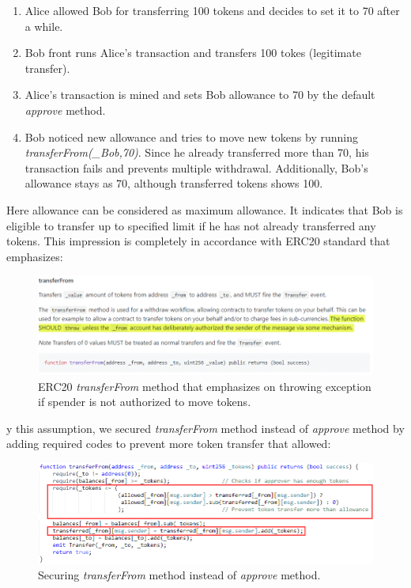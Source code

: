 \begin{enumerate}
	\item Alice allowed Bob for transferring 100 tokens and decides to set it to 70 after a while.
	\item Bob front runs Alice’s transaction and transfers 100 tokes (legitimate transfer).
	\item Alice’s transaction is mined and sets Bob allowance to 70 by the default \textit{approve} method.
	\item Bob noticed new allowance and tries to move new tokens by running \textit{transferFrom(\_Bob,70)}. Since he already transferred more than 70, his transaction fails and prevents multiple withdrawal. Additionally, Bob’s allowance stays as 70, although transferred tokens shows 100.
\end{enumerate}

Here allowance can be considered as maximum allowance. It indicates that Bob is eligible to transfer up to specified limit if he has not already transferred any tokens. This impression is completely in accordance with ERC20 standard that emphasizes:

\begin{figure}[t]
	\centering
	\includegraphics[width=1.0\linewidth]{figures/multiple_withdrawal_30.png}
	\caption{ERC20 \textit{transferFrom} method that emphasizes on throwing exception if spender is not authorized to move tokens.}
\end{figure}

 y this assumption, we secured \textit{transferFrom} method instead of \textit{approve} method by adding required codes to prevent more token transfer that allowed:
 
\begin{figure}[t]
	\centering
	\includegraphics[width=1.0\linewidth]{figures/multiple_withdrawal_31.png}
	\caption{Securing \textit{transferFrom} method instead of \textit{approve} method.}
\end{figure}


